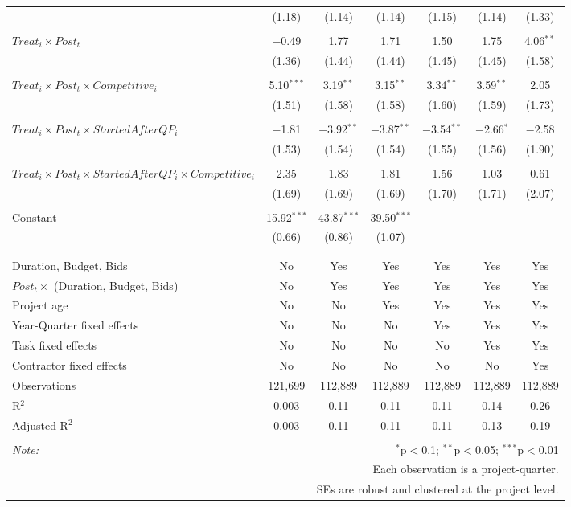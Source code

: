 \documentclass[
]{article}
\begin{document}
\begin{table}[H]
\begin{tabular}{@{\extracolsep{-3pt}}lcccccc}
  & (1.18) & (1.14) & (1.14) & (1.15) & (1.14) & (1.33) \\ 
  & & & & & & \\ 
 $Treat_i \times Post_t$ & $-$0.49 & 1.77 & 1.71 & 1.50 & 1.75 & 4.06$^{**}$ \\ 
  & (1.36) & (1.44) & (1.44) & (1.45) & (1.45) & (1.58) \\ 
  & & & & & & \\ 
 $Treat_i \times Post_t \times Competitive_i$ & 5.10$^{***}$ & 3.19$^{**}$ & 3.15$^{**}$ & 3.34$^{**}$ & 3.59$^{**}$ & 2.05 \\ 
  & (1.51) & (1.58) & (1.58) & (1.60) & (1.59) & (1.73) \\ 
  & & & & & & \\ 
 $Treat_i \times Post_t \times StartedAfterQP_i$ & $-$1.81 & $-$3.92$^{**}$ & $-$3.87$^{**}$ & $-$3.54$^{**}$ & $-$2.66$^{*}$ & $-$2.58 \\ 
  & (1.53) & (1.54) & (1.54) & (1.55) & (1.56) & (1.90) \\ 
  & & & & & & \\ 
 $Treat_i \times Post_t \times StartedAfterQP_i \times Competitive_i$ & 2.35 & 1.83 & 1.81 & 1.56 & 1.03 & 0.61 \\ 
  & (1.69) & (1.69) & (1.69) & (1.70) & (1.71) & (2.07) \\ 
  & & & & & & \\ 
 Constant & 15.92$^{***}$ & 43.87$^{***}$ & 39.50$^{***}$ &  &  &  \\ 
  & (0.66) & (0.86) & (1.07) &  &  &  \\ 
  & & & & & & \\ 
\hline \\[-1.8ex] 
Duration, Budget, Bids & No & Yes & Yes & Yes & Yes & Yes \\ 
$Post_t \times $  (Duration, Budget, Bids) & No & Yes & Yes & Yes & Yes & Yes \\ 
Project age & No & No & Yes & Yes & Yes & Yes \\ 
Year-Quarter fixed effects & No & No & No & Yes & Yes & Yes \\ 
Task fixed effects & No & No & No & No & Yes & Yes \\ 
Contractor fixed effects & No & No & No & No & No & Yes \\ 
Observations & 121,699 & 112,889 & 112,889 & 112,889 & 112,889 & 112,889 \\ 
R$^{2}$ & 0.003 & 0.11 & 0.11 & 0.11 & 0.14 & 0.26 \\ 
Adjusted R$^{2}$ & 0.003 & 0.11 & 0.11 & 0.11 & 0.13 & 0.19 \\ 
\hline 
\hline \\[-1.8ex] 
\textit{Note:}  & \multicolumn{6}{r}{$^{*}$p$<$0.1; $^{**}$p$<$0.05; $^{***}$p$<$0.01} \\ 
 & \multicolumn{6}{r}{Each observation is a project-quarter.} \\ 
 & \multicolumn{6}{r}{SEs are robust and clustered at the project level.} \\ 
\end{tabular} 
\end{table}
\end{document}
